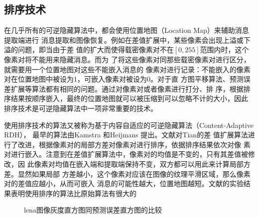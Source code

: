 \subsection{排序技术}
在几乎所有的可逆隐藏算法中，都会使用位置地图（Location Map）来辅助消息提取端进行
消息提取和图像恢复。例如在差值扩展中，某些像素会出现上溢或下溢的问题，即当由于差
值的扩大而使得载密像素对不在$[0,255]$范围内时，这个像素对将不能用来隐藏消息。而为
了将这些像素对同那些载密像素对进行区分，就需要用一个位置地图对这些不能嵌入消息的
像素对进行记录：不能嵌入的像素对在位置地图中被设为1，可嵌入像素对被设为0。对于直
方图平移算法、预测误差扩展等算法都有相同的问题。通过对像素对或者像素进行打分、排
序，根据排序结果按顺序嵌入，最终的位置地图就可以被压缩到可以忽略不计的大小，因此
排序技术是可逆隐藏算法中一项非常重要的技术。
\par
使用排序技术的算法又被称为基于内容自适应的可逆隐藏算法（Content-Adaptive RDH），
最早的算法由Kamstra 和Heijmans 提出\cite{kamstra2005reversible}。文献对Tian的差
值扩展算法进行了改进，根据像素对的局部方差对像素对进行排序，依据排序结果依次对像
素对进行嵌入。注意到在差值扩展算法中，像素对的均值是不变的，只有其差值被修改，因
此像素对均值在嵌入端和提取端保持不变，双方都可以用此来计算局部方差。显然如果局部
方差越小，这个像素对应该在图像的纹理平滑区域，那么像素对的差值应越小，从而可嵌入
消息的可能性越大，位置地图越短。文献的实验结果表明使用排序的算法比原始算法有很大的
\begin{figure}[!h]
\centering 
{}
\caption{lena图像灰度直方图同预测误差直方图的比较}
\label{fig:airplane_pe_compare}
\end{figure}
